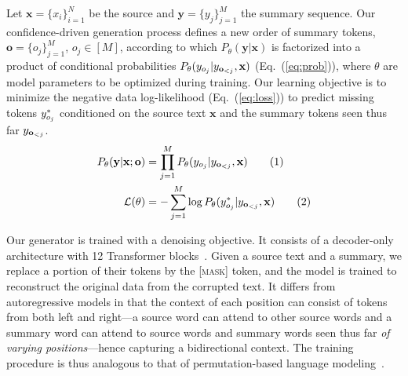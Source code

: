 \documentclass[11pt]{article}
\newcommand\numberthis{\addtocounter{equation}{1}\tag{\theequation}}
\begin{document}
Let $\mathbf{x}=\{x_i\}_{i=1}^N$ be the source and $\mathbf{y}=\{y_j\}_{j=1}^M$ the summary sequence.
Our confidence-driven generation process defines a new order of summary tokens, $\mathbf{o}=\{o_j\}_{j=1}^M$, $o_j \in [M]$, 
according to which $P_\theta(\mathbf{y}|\mathbf{x})$ is factorized into a product of conditional probabilities $P_\theta(y_{\textcolor{black}{o_j}}|y_{\textcolor{black}{\mathbf{o}_{<j}}},\mathbf{x})$ (Eq.~(\ref{eq:prob})),
where $\theta$ are model parameters to be optimized during training.
Our learning objective is to minimize the negative data log-likelihood (Eq.~(\ref{eq:loss})) to predict missing tokens $y_{\textcolor{black}{o_j}}^*$ conditioned on the source text $\mathbf{x}$ and the summary tokens seen thus far $y_{\textcolor{black}{\mathbf{o}_{<j}}}$.
\begin{align*}
\textstyle
P_\theta(\mathbf{y}|\mathbf{x};\mathbf{o}) &= \prod_{j=1}^M P_\theta(y_{\textcolor{black}{o_j}}|y_{\textcolor{black}{\mathbf{o}_{<j}}},\mathbf{x})
\numberthis\label{eq:prob}\\
\mathcal{L}(\theta) &= - \sum_{j=1}^M \log P_\theta(y_{\textcolor{black}{o_j}}^*|y_{\textcolor{black}{\mathbf{o}_{<j}}},\mathbf{x}) \numberthis\label{eq:loss}
\end{align*} 


Our generator is trained with a denoising objective.
It consists of a decoder-only architecture with 12 Transformer blocks~\cite{NIPS2019_9464}.
Given a source text and a summary, we replace a portion of their tokens by the \textsc{[mask]} token, and the model is trained to reconstruct the original data from the corrupted text.
It differs from autoregressive models in that the context of each position can consist of tokens from both left and right—a source word can attend to other source words and a summary word can attend to source words and summary words seen thus far \emph{of varying positions}—hence capturing a bidirectional context.
The training procedure is thus analogous to that of permutation-based language modeling~\cite{NIPS2019_8812}.
\end{document}
